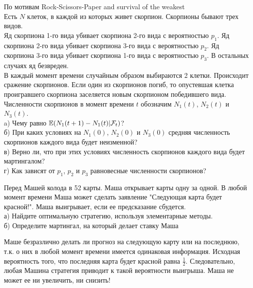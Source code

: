 \begin{problem}
По мотивам Rock-Scissors-Paper and survival of the weakest \\
Есть $N$ клеток, в каждой из которых живет скорпион. Скорпионы
бывают трех видов. \\
Яд скорпиона 1-го вида убивает скорпиона 2-го вида с вероятностью
$p_{1}$. Яд скорпиона 2-го вида убивает скорпиона 3-го вида с
вероятностью $p_{2}$. Яд скорпиона 3-го вида убивает скорпиона
1-го вида с вероятностью $p_{3}$. В остальных случаях яд
безвреден. \\
В каждый момент времени случайным образом выбираются 2 клетки.
Происходит сражение скорпионов. Если один из скорпионов погиб, то
опустевшая клетка проигравшего скорпиона заселяется новым
скорпионом победившего вида. \\
Численности скорпионов в момент времени $t$ обозначим $N_{1}(t)$,
$N_{2}(t)$ и $N_{3}(t)$. \\
a) Чему равно $\mathbb{E}(N_{1}(t+1)-N_{1}(t)|\mathcal{F}_{t})$? \\
б) При каких условиях на $N_{1}(0)$, $N_{2}(0)$ и $N_{3}(0)$
средняя численность скорпионов каждого вида будет неизменной? \\
в) Верно ли, что при этих условиях численность скорпионов каждого
вида будет мартингалом? \\
г) Как зависят от $p_{1}$, $p_{2}$ и $p_{3}$ равновесные
численности скорпионов?

\begin{sol}

\end{sol}
\end{problem}

\begin{problem}
Перед Машей колода в 52 карты. Маша открывает карты одну за одной.
В любой момент времени Маша может сделать заявление "Следующая
карта будет красной!". Маша выигрывает, если ее
предсказание сбудется. \\
а) Найдите оптимальную стратегию, используя элементарные методы. \\
б) Определите мартингал, на который делает ставку Маша

\begin{sol}
Маше безразлично делать ли прогноз на следующую карту или на
последнюю, т.к. о них в любой момент времени имеется одинаковая
информация. Исходная вероятность того, что последняя карта будет
красной равна $\frac{1}{2}$. Следовательно, любая Машина стратегия
приводит к такой вероятности выигрыша. Маша не может ее ни
увеличить, ни снизить!
\end{sol}
\end{problem}


